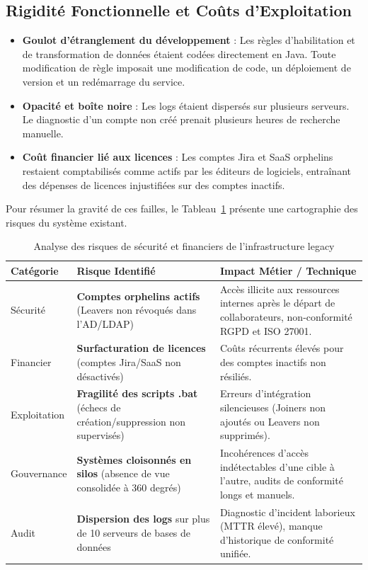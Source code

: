 \subsection{Rigidité Fonctionnelle et Coûts d'Exploitation}
\begin{itemize}
    \item \textbf{Goulot d'étranglement du développement} : Les règles d'habilitation et de transformation de données étaient codées directement en Java. Toute modification de règle imposait une modification de code, un déploiement de version et un redémarrage du service.
    \item \textbf{Opacité et boîte noire} : Les logs étaient dispersés sur plusieurs serveurs. Le diagnostic d'un compte non créé prenait plusieurs heures de recherche manuelle.
    \item \textbf{Coût financier lié aux licences} : Les comptes Jira et SaaS orphelins restaient comptabilisés comme actifs par les éditeurs de logiciels, entraînant des dépenses de licences injustifiées sur des comptes inactifs.
\end{itemize}

Pour résumer la gravité de ces failles, le Tableau~\ref{tab:analyse_risques_legacy} présente une cartographie des risques du système existant.

\begin{table}[H]
    \centering
    \caption{Analyse des risques de sécurité et financiers de l'infrastructure legacy}
    \label{tab:analyse_risques_legacy}
    \begin{tabular}{lp{5.5cm}p{5.5cm}}
        \toprule
        \textbf{Catégorie} & \textbf{Risque Identifié} & \textbf{Impact Métier / Technique} \\
        \midrule
        Sécurité & \textbf{Comptes orphelins actifs} (Leavers non révoqués dans l'AD/LDAP) & Accès illicite aux ressources internes après le départ de collaborateurs, non-conformité RGPD et ISO 27001. \\
        Financier & \textbf{Surfacturation de licences} (comptes Jira/SaaS non désactivés) & Coûts récurrents élevés pour des comptes inactifs non résiliés. \\
        Exploitation & \textbf{Fragilité des scripts .bat} (échecs de création/suppression non supervisés) & Erreurs d'intégration silencieuses (Joiners non ajoutés ou Leavers non supprimés). \\
        Gouvernance & \textbf{Systèmes cloisonnés en silos} (absence de vue consolidée à 360 degrés) & Incohérences d'accès indétectables d'une cible à l'autre, audits de conformité longs et manuels. \\
        Audit & \textbf{Dispersion des logs} sur plus de 10 serveurs de bases de données & Diagnostic d'incident laborieux (MTTR élevé), manque d'historique de conformité unifiée. \\
        \bottomrule
    \end{tabular}
\end{table}


